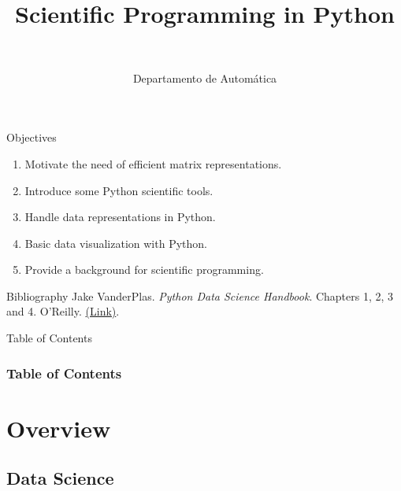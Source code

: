 \documentclass[10pt,compress]{beamer} %
\title[Scientific Programming]{Scientific Programming in Python}
\author{\asignatura\\\carrera}
\institute{}
\date{Departamento de Automática}
\begin{document}
{\titlepageBlue
    \begin{frame}
        \titlepage
    \end{frame}
}

\begin{frame}[plain]{}
	\begin{block}{Objectives}
		\begin{enumerate}
		\item Motivate the need of efficient matrix representations.
		\item Introduce some Python scientific tools.
		\item Handle data representations in Python.
		\item Basic data visualization with Python.
		\item Provide a background for scientific programming.
		\end{enumerate}
	\end{block}

   \begin{block}{Bibliography}
       Jake VanderPlas. \textit{Python Data Science Handbook}. Chapters 1, 2, 3 and 4. O'Reilly. \href{https://jakevdp.github.io/PythonDataScienceHandbook/}{(Link)}.
   \end{block}

\end{frame}

{
\begin{frame}[shrink]{Table of Contents}
 \frametitle{Table of Contents}
 \tableofcontents
\end{frame}
}

\section{Overview}

\subsection{Data Science}
\end{document}
